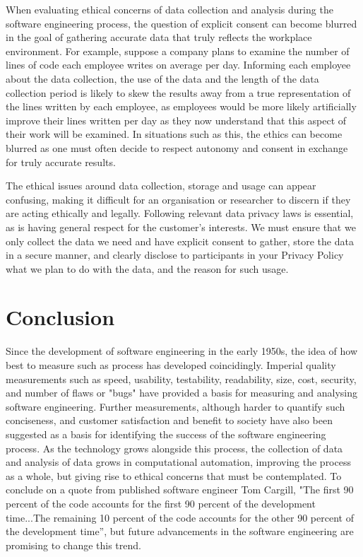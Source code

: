 \documentclass{article}
\begin{document}
When evaluating ethical concerns of data collection and analysis during the software engineering process, the question of explicit consent can become blurred in the goal of gathering accurate data that truly reflects the workplace environment. For example, suppose a company plans to examine the number of lines of code each employee writes on average per day. Informing each employee about the data collection, the use of the data and the length of the data collection period is likely to skew the results away from a true representation of the lines written by each employee, as employees would be more likely artificially improve their lines written per day as they now understand that this aspect of their work will be examined. In situations such as this, the ethics can become blurred as one must often decide to respect autonomy and consent in exchange for truly accurate results. \newline

The ethical issues around data collection, storage and usage can appear confusing, making it difficult for an organisation or researcher to discern if they are acting ethically and legally. Following relevant data privacy laws is essential, as is having general respect for the customer’s interests. We must ensure that we only collect the data we need and have explicit consent to gather, store the data in a secure manner, and clearly disclose to participants in your Privacy Policy what we plan to do with the data, and the reason for such usage.  \newline

\section{Conclusion} Since the development of software engineering in the early 1950s, the idea of how best to measure such as process has developed coincidingly. Imperial quality measurements such as speed, usability, testability, readability, size, cost, security, and number of flaws or "bugs" have provided a basis for measuring and analysing software engineering. Further measurements, although harder to quantify such conciseness, and customer satisfaction and benefit to society have also been suggested as a basis for identifying the success of the software engineering process. As the technology grows alongside this process, the collection of data and analysis of data grows in computational automation, improving the process as a whole, but giving rise to ethical concerns that must be contemplated. To conclude on a quote from published software engineer Tom Cargill, "The first 90 percent of the code accounts for the first 90 percent of the development time...The remaining 10 percent of the code accounts for the other 90 percent of the development time'', but future advancements in the software engineering are promising to change this trend. 
\end{document}
